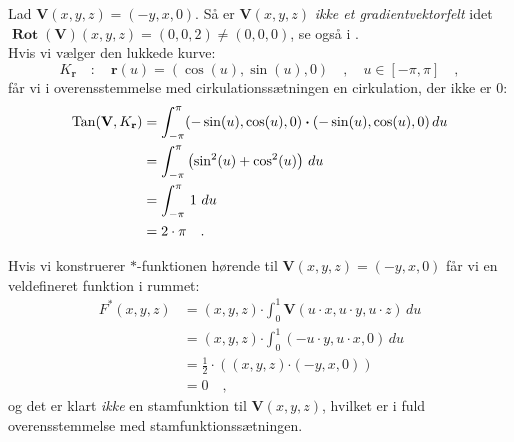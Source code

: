 \begin{example}\label{exampTangKurvRot}
Lad $\mathbf{V}(x,y,z) = (-y, x, 0)$. Så er  $\mathbf{V}(x,y,z)$ {\emph{ikke et gradientvektorfelt}} idet $\operatorname{\mathbf{Rot}}(\mathbf{V})(x,y,z) = (0,0,2) \neq (0,0,0)$, se også
 i  .\\

 Hvis vi vælger den lukkede kurve:
\begin{equation}
K_{\mathbf{r}} \quad : \quad \mathbf{r}(u) = (\cos(u), \sin(u), 0)  \quad , \quad u\in [-\pi, \pi] \quad ,
\end{equation}
får vi i overensstemmelse med cirkulationssætningen en cirkulation, der ikke er $0$:
\begin{equation}
\begin{aligned}
\operatorname{Tan}(\mathbf{V}, K_{\mathbf{r}}) &= \int_{-\pi}^{\pi} (- \sin(u), \cos(u), 0 )\bm{\cdot}(-\sin(u), \cos(u), 0)\, du \\
&= \int_{-\pi}^{\pi} \left( \sin^{2}(u) + \cos^{2}(u) \right)\, du \\
&= \int_{-\pi}^{\pi} \, 1 \, \, du \\
&= 2\cdot \pi \quad. \\
\end{aligned}
\end{equation}

Hvis vi konstruerer $*$-funktionen hørende til $\mathbf{V}(x,y,z) = (-y, x, 0)$ får vi en veldefineret funktion i rummet:
\begin{equation}
\begin{aligned}
F^{*}(x,y,z) &= (x,y,z)\bm{\cdot} \int_{0}^{1} \mathbf{V}(u\cdot x, u\cdot y,u\cdot z) \, du \\
&= (x,y,z)\bm{\cdot} \int_{0}^{1}( -u\cdot y, u\cdot x, 0) \, du \\
&= \frac{1}{2}\cdot \left( (x,y,z)\bm{\cdot} (-y, x, 0) \right) \\
&= 0 \quad ,
\end{aligned}
\end{equation}
og det er klart \emph{ikke}
en stamfunktion til $\mathbf{V}(x,y,z)$, hvilket er i fuld overensstemmelse med stamfunktionssætningen.
\end{example}











